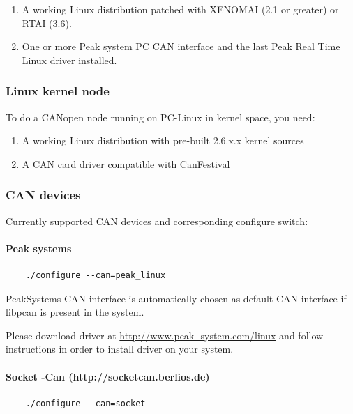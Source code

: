 \documentclass[12pt,english,a4paper]{book}
\begin{document}
\begin{enumerate}
\item A working Linux distribution patched with XENOMAI (2.1 or greater) or RTAI (3.6). 
\item One or more Peak system PC CAN interface and the last Peak Real Time
Linux driver installed. 
\end{enumerate}

\subsubsection{Linux kernel node}

To do a CANopen node running on PC-Linux in kernel space, you need:


\begin{enumerate}
\item A working Linux distribution with pre-built 2.6.x.x kernel sources
\item A CAN card driver compatible with CanFestival
\end{enumerate}


\subsubsection{CAN devices}

Currently supported CAN devices and corresponding configure switch:


\paragraph{Peak systems}


\begin{verbatim}
	./configure --can=peak_linux
\end{verbatim}


PeakSystems CAN interface is automatically chosen as default CAN interface
if libpcan is present in the system.

Please download driver at \href{http://www.peak-system.com/linux}{http://www.peak
-system.com/linux} and follow instructions in order to install driver
on your system.


\paragraph{Socket -Can (http://socketcan.berlios.de)}


\begin{verbatim}
	./configure --can=socket
\end{verbatim}
\end{document}
